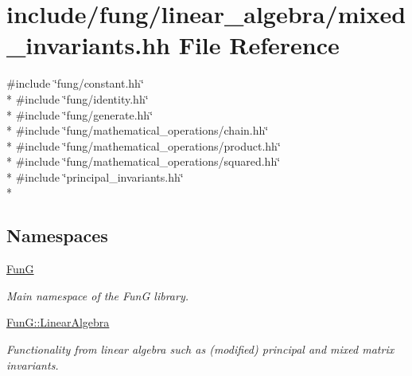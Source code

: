 \hypertarget{mixed__invariants_8hh}{\section{include/fung/linear\-\_\-algebra/mixed\-\_\-invariants.hh File Reference}
\label{mixed__invariants_8hh}
}
{\ttfamily \#include \char`\"{}fung/constant.\-hh\char`\"{}}\\*
{\ttfamily \#include \char`\"{}fung/identity.\-hh\char`\"{}}\\*
{\ttfamily \#include \char`\"{}fung/generate.\-hh\char`\"{}}\\*
{\ttfamily \#include \char`\"{}fung/mathematical\-\_\-operations/chain.\-hh\char`\"{}}\\*
{\ttfamily \#include \char`\"{}fung/mathematical\-\_\-operations/product.\-hh\char`\"{}}\\*
{\ttfamily \#include \char`\"{}fung/mathematical\-\_\-operations/squared.\-hh\char`\"{}}\\*
{\ttfamily \#include \char`\"{}principal\-\_\-invariants.\-hh\char`\"{}}\\*
\subsection*{Namespaces}
\begin{DoxyCompactItemize}
\item 
\hyperlink{namespaceFunG}{Fun\-G}
\begin{DoxyCompactList}\small\item\em Main namespace of the Fun\-G library. \end{DoxyCompactList}\item 
\hyperlink{namespaceFunG_1_1LinearAlgebra}{Fun\-G\-::\-Linear\-Algebra}
\begin{DoxyCompactList}\small\item\em Functionality from linear algebra such as (modified) principal and mixed matrix invariants. \end{DoxyCompactList}\end{DoxyCompactItemize}
